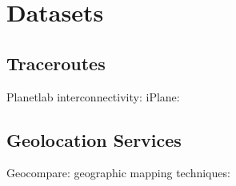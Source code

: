\section{Datasets}
\label{datasets}

\subsection{Traceroutes}
Planetlab interconnectivity: \cite{banerjee2004interdomain}
iPlane: \cite{madhyastha2006iplane}

\subsection{Geolocation Services}
Geocompare: \cite{huffaker2011geocompare}
geographic mapping techniques: \cite{padmanabhan2001investigation}
